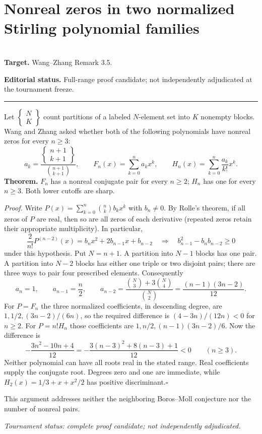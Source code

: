 \documentclass[11pt,a4paper]{article}
\begin{document}
\section{Nonreal zeros in two normalized Stirling polynomial families}
\label{section:R23R}
\\[3pt]
\noindent\textbf{Target.} Wang--Zhang Remark 3.5.

\noindent\textbf{Editorial status.} Full-range proof candidate; not independently adjudicated at the tournament freeze. 

\smallskip\hrule\medskip



\begingroup
\newcommand{\St}[2]{\left\{\!\begin{smallmatrix}#1\\#2\end{smallmatrix}\!\right\}}
\setcounter{equation}{0}
\renewcommand{\theequation}{\thesection.\arabic{equation}}
\renewcommand{\theHequation}{R23R.\arabic{equation}}
\noindent Let $\St{N}{K}$ count partitions of a labeled $N$-element set into $K$ nonempty
blocks. Wang and Zhang \cite[Remark~3.5]{R23R:plain1} asked whether both of the following
polynomials have nonreal zeros for every $n\ge3$:
\[
  a_k=\frac{\St{n+1}{k+1}}{\binom{n+1}{k+1}},\qquad
  F_n(x)=\sum_{k=0}^n a_kx^k,\qquad H_n(x)=\sum_{k=0}^n\frac{a_k}{k!}x^k.
\]
\textbf{Theorem.} $F_n$ has a nonreal conjugate pair for every $n\ge2$;
$H_n$ has one for every $n\ge3$. Both lower cutoffs are sharp.
\par\medskip\noindent
\textit{Proof.} Write $P(x)=\sum_{k=0}^n\binom nk b_kx^k$ with $b_n\ne0$. By Rolle's
theorem, if all zeros of $P$ are real, then so are all zeros of each derivative
(repeated zeros retain their appropriate multiplicity). In particular,
\[
 \frac{2}{n!}P^{(n-2)}(x)= b_nx^2+2b_{n-1}x+b_{n-2}
 \quad\Longrightarrow\quad b_{n-1}^2-b_nb_{n-2}\ge0
\]
under this hypothesis. Put $N=n+1$. A partition into $N-1$ blocks has one
pair. A partition into $N-2$ blocks has either one triple or two disjoint pairs;
there are three ways to pair four prescribed elements. Consequently
\[
 a_n=1,\qquad a_{n-1}=\frac n2,\qquad
 a_{n-2}=\frac{\binom N3+3\binom N4}{\binom N2}
        =\frac{(n-1)(3n-2)}{12}.
\]
For $P=F_n$ the three normalized coefficients, in descending degree, are
$1,1/2,(3n-2)/(6n)$, so the required difference is $(4-3n)/(12n)<0$ for
$n\ge2$. For $P=n!H_n$ those coefficients are
$1,n/2,(n-1)(3n-2)/6$. Now the difference is
\[
 -\frac{3n^2-10n+4}{12}
 =-\frac{3(n-3)^2+8(n-3)+1}{12}<0 \qquad(n\ge3).
\]
Neither polynomial can have all roots real in the stated range. Real coefficients
supply the conjugate root. Degrees zero and one are immediate, while
$H_2(x)=1/3+x+x^2/2$ has positive discriminant.\hfill$\square$
\par\medskip\noindent\small
This argument addresses neither the neighboring Boros--Moll conjecture nor the number of nonreal pairs.
\par\medskip\noindent\textit{Tournament status: complete proof candidate; not independently adjudicated.}
\endgroup
\end{document}
